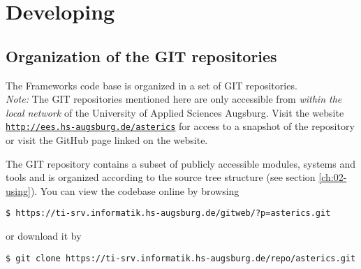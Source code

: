 




\chapter{Developing \asterics} \label{ch:03-developing}


\section{Organization of the GIT repositories}

The \asterics Frameworks code base is organized in a set of GIT repositories.\\
\emph{Note:} The GIT repositories mentioned here are only accessible from \emph{within the local network} of the University of Applied Sciences Augsburg.
Visit the website \texttt{\url{http://ees.hs-augsburg.de/asterics}} for access to a snapshot of the repository or visit the GitHub page linked on the website.

The \asterics GIT repository contains a subset of publicly accessible modules, systems and tools and is organized according to the source tree structure (see section \ref{ch:02-using}).
You can view the codebase online by browsing

\begin{footnotesize}
    \begin{lstlisting}[style=shell]
$ https://ti-srv.informatik.hs-augsburg.de/gitweb/?p=asterics.git
    \end{lstlisting}
\end{footnotesize}

\noindent or download it by 

\begin{footnotesize}
    \begin{lstlisting}[style=shell]
$ git clone https://ti-srv.informatik.hs-augsburg.de/repo/asterics.git
    \end{lstlisting}
\end{footnotesize}

